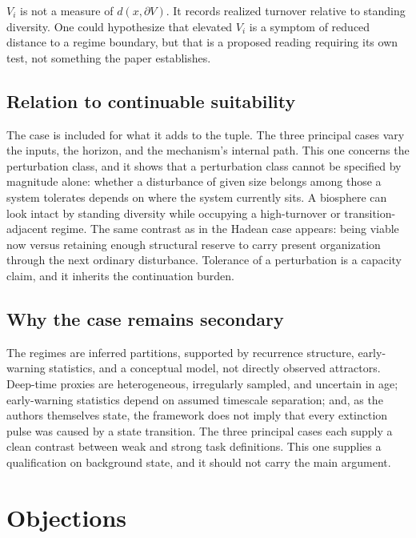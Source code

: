 \documentclass[11pt]{article}
\theoremstyle{definition}
\begin{document}
$V_i$ is not a measure of $d(x,\partial V)$. It records realized turnover relative to standing diversity. One could hypothesize that elevated $V_i$ is a symptom of reduced distance to a regime boundary, but that is a proposed reading requiring its own test, not something the paper establishes.

\subsection{Relation to continuable suitability}

The case is included for what it adds to the tuple. The three principal cases vary the inputs, the horizon, and the mechanism's internal path. This one concerns the perturbation class, and it shows that a perturbation class cannot be specified by magnitude alone: whether a disturbance of given size belongs among those a system tolerates depends on where the system currently sits. A biosphere can look intact by standing diversity while occupying a high-turnover or transition-adjacent regime. The same contrast as in the Hadean case appears: being viable now versus retaining enough structural reserve to carry present organization through the next ordinary disturbance. Tolerance of a perturbation is a capacity claim, and it inherits the continuation burden.

\subsection{Why the case remains secondary}

The regimes are inferred partitions, supported by recurrence structure, early-warning statistics, and a conceptual model, not directly observed attractors. Deep-time proxies are heterogeneous, irregularly sampled, and uncertain in age; early-warning statistics depend on assumed timescale separation; and, as the authors themselves state, the framework does not imply that every extinction pulse was caused by a state transition. The three principal cases each supply a clean contrast between weak and strong task definitions. This one supplies a qualification on background state, and it should not carry the main argument.

\section{Objections}\label{sec:objections}
\end{document}
